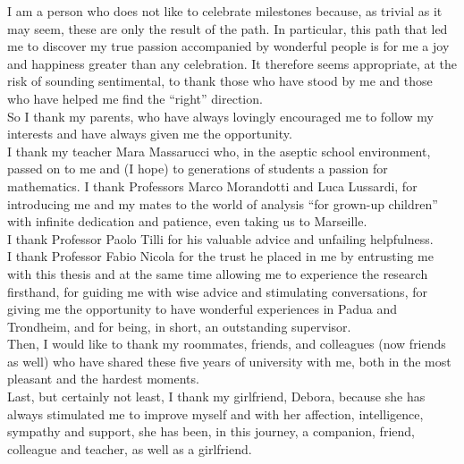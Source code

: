 \documentclass[corpo=11pt, stile=classica, tipotesi=custom,
greek, evenboxes, english, twoside, cucitura]{toptesi} %
\numberwithin{equation}{chapter}
\theoremstyle{definition}
\theoremstyle{remark}
\begin{document}
\english

\ringraziamenti
I am a person who does not like to celebrate milestones because, as trivial as it may seem, these are only the result of the path. In particular, this path that led me to discover my true passion accompanied by wonderful people is for me a joy and happiness greater than any celebration.
It therefore seems appropriate, at the risk of sounding sentimental, to thank those who have stood by me and those who have helped me find the ``right'' direction.\\
So I thank my parents, who have always lovingly encouraged me to follow my interests and have always given me the opportunity.\\
I thank my teacher Mara Massarucci who, in the aseptic school environment, passed on to me and (I hope) to generations of students a passion for mathematics.
I thank Professors Marco Morandotti and Luca Lussardi, for introducing me and my mates to the world of analysis ``for grown-up children'' with infinite dedication and patience, even taking us to Marseille.\\
I thank Professor Paolo Tilli for his valuable advice and unfailing helpfulness.\\
I thank Professor Fabio Nicola for the trust he placed in me by entrusting me with this thesis and at the same time allowing me to experience the research firsthand, for guiding me with wise advice and stimulating conversations, for giving me the opportunity to have wonderful experiences in Padua and Trondheim, and for being, in short, an outstanding supervisor.\\
Then, I would like to thank my roommates, friends, and colleagues (now friends as well) who have shared these five years of university with me, both in the most pleasant and the hardest moments.\\
Last, but certainly not least, I thank my girlfriend, Debora, because she has always stimulated me to improve myself and with her affection, intelligence, sympathy and support, she has been, in this journey, a companion, friend, colleague and teacher, as well as a girlfriend.
\end{document}

